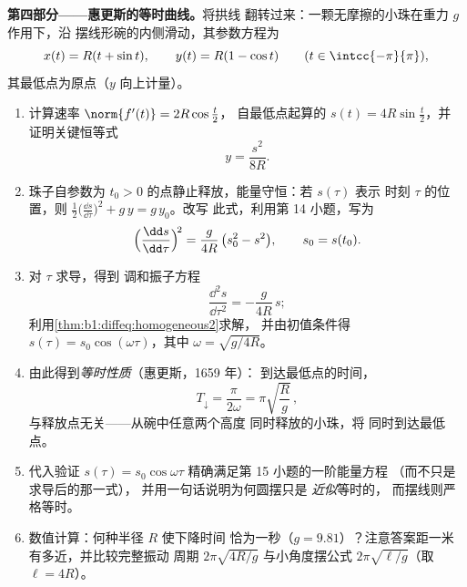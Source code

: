 \begin{problem}
\medskip
\noindent\textbf{第四部分——惠更斯的等时曲线。}将拱线
        翻转过来：一颗无摩擦的小珠在重力 $g$ 作用下，沿
        摆线形碗的内侧滑动，其参数方程为
\[
x(t) = R(t + \sin t), \qquad y(t) = R(1 - \cos t)
\qquad (t \in \intcc{-\pi}{\pi}),
\]
        其最低点为原点（$y$ 向上计量）。
\begin{enumerate}[resume]
  \item 计算速率 $\norm{f'(t)} = 2R\cos\frac t2$，
        自最低点起算的 $s(t) = 4R\sin\frac t2$，并
        证明关键恒等式
        \[
        y = \frac{s^2}{8R} .
        \]
  \item 珠子自参数为
        $t_0 > 0$ 的点静止释放，能量守恒：若 $s(\tau)$ 表示
        时刻 $\tau$ 的位置，则 $\frac12\bigl(
        \frac{\dd s}{\dd\tau}\bigr)^2 + g\,y = g\,y_0$。改写
        此式，利用第 14 小题，写为
        \[
        \Bigl(\frac{\dd s}{\dd\tau}\Bigr)^{\!2}
        = \frac{g}{4R}\,\bigl(s_0^2 - s^2\bigr),
        \qquad s_0 = s(t_0).
        \]
  \item 对 $\tau$ 求导，得到
        调和振子方程
        \[
        \frac{\dd^2 s}{\dd\tau^2} = -\frac{g}{4R}\,s ;
        \]
        利用\cref{thm:b1:diffeq:homogeneous2}求解，
        并由初值条件得 $s(\tau) = s_0\cos(\omega\tau)$，其中
        $\omega = \sqrt{g/4R}$。
  \item 由此得到\emph{等时性质}（惠更斯，1659 年）：
        到达最低点的时间，
        \[
        T_{\downarrow} = \frac{\pi}{2\omega}
        = \pi\sqrt{\frac Rg}\,,
        \]
        与释放点无关——从碗中任意两个高度
        同时释放的小珠，将
        同时到达最低点。
  \item 代入验证 $s(\tau) =
        s_0\cos\omega\tau$ 精确满足第 15 小题的一阶能量方程
        （而不只是求导后的那一式），
        并用一句话说明为何圆摆只是
        \emph{近似}等时的，
        而摆线则严格等时。
  \item 数值计算：何种半径 $R$ 使下降时间
        恰为一秒（$g = 9.81$）？注意答案距一米
        有多近，并比较完整振动
        周期 $2\pi\sqrt{4R/g}$ 与小角度摆公式
        $2\pi\sqrt{\ell/g}$（取 $\ell = 4R$）。
\end{enumerate}


\end{problem}

